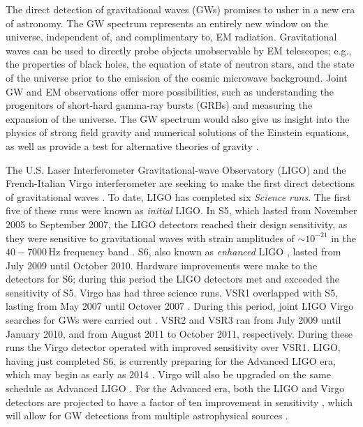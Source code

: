 The direct detection of gravitational waves (GWs) promises to usher in a new
era of astronomy.  The \ac{GW} spectrum represents an entirely new window on
the universe, independent of, and complimentary to, \ac{EM} radiation.
Gravitational waves can be used to directly probe objects unobservable by EM
telescopes; e.g., the properties of black holes, the equation of state of
neutron stars, and the state of the universe prior to the emission of the
cosmic microwave background.  Joint GW and EM observations offer more
possibilities, such as understanding the progenitors of short-hard gamma-ray
bursts (GRBs) and measuring the expansion of the universe. The GW spectrum
would also give us insight into the physics of strong field gravity and
numerical solutions of the Einstein equations, as well as provide a test for
alternative theories of gravity \cite{SathyaSchutz:livingReveiw:2009}.

The U.S. Laser Interferometer Gravitational-wave Observatory (LIGO) and the
French-Italian Virgo interferometer are seeking to make the first direct
detections of gravitational waves \cite{Abbott:2007kv}.  To date, \ac{LIGO} has
completed six \emph{Science runs}. The first five of these runs were known as
\emph{initial} \ac{LIGO}. In \ac{S5}, which lasted from November 2005 to
September 2007, the \ac{LIGO} detectors reached their design sensitivity, as
they were sensitive to gravitational waves with strain amplitudes of
$\sim10^{-21}$ in the $40-7000\,$Hz frequency band \cite{Abbott:2007kv}.
\ac{S6}, also known as \emph{enhanced} \ac{LIGO} \cite{Adhikari:2006}, lasted
from July 2009 until October 2010. Hardware improvements were make to the
detectors for \ac{S6}; during this period the \ac{LIGO} detectors met and
exceeded the sensitivity of \ac{S5}. Virgo has had three science runs.
\ac{VSR1} overlapped with \ac{S5}, lasting from May 2007 until Octover 2007
\cite{Acernese:2008zzf}. During this period, joint \ac{LIGO} Virgo searches for
\acp{GW} were carried out \cite{S5VSR1Burst, S5LowMassLV,
Collaboration:2009kk}. \ac{VSR2} and \ac{VSR3} ran from July 2009 until January
2010, and from August 2011 to October 2011, respectively. During these runs the
Virgo detector operated with improved sensitivity over \ac{VSR1}. \ac{LIGO},
having just completed \ac{S6}, is currently preparing for the Advanced
\ac{LIGO} era, which may begin as early as 2014 \cite{Harry:2010zz}. Virgo will
also be upgraded on the same schedule as Advanced \ac{LIGO}
\cite{Acernese:2008zzf}. For the Advanced era, both the \ac{LIGO} and Virgo
detectors are projected to have a factor of ten improvement in sensitivity
\cite{Harry:2010zz, PSD:AV}, which will allow for \ac{GW} detections from
multiple astrophysical sources \cite{Harry:2010zz, ratesdoc}.

